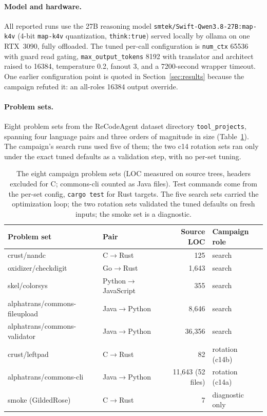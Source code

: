 \documentclass[11pt]{article}
\begin{document}
\paragraph{Model and hardware.}
All reported runs use the 27B reasoning model
\texttt{smtek/Swift-Qwen3.8-\allowbreak27B:map-k4v} (4-bit
\texttt{map-k4v}
quantization, \texttt{think:true}) served locally by ollama on one
RTX~3090, fully offloaded. The tuned per-call configuration is
\texttt{num\_ctx} 65536 with guard read gating,
\texttt{max\_out\allowbreak{}put\_to\allowbreak{}kens} 8192 with
translator and architect raised
to 16384, temperature 0.2, fanout 3, and a 7200-second wrapper
timeout.
One earlier configuration point is quoted in
Section~\ref{sec:results} because the campaign refuted it: an all-roles
16384 output override.

\paragraph{Problem sets.}
Eight problem sets from the ReCodeAgent dataset directory
\texttt{tool\_projects}, spanning four language
pairs and three orders of magnitude in size
(Table~\ref{tab:problems}). The campaign's search runs used five of
them; the two c14 rotation sets ran only under the exact tuned defaults
as a validation step, with no per-set tuning.

\begin{table}[ht]
\centering
\begin{tabular}{llrl}
\toprule
Problem set & Pair & Source LOC & Campaign role \\
\midrule
crust/nandc & C$\to$Rust & 125 & search \\
oxidizer/checkdigit & Go$\to$Rust & 1{,}643 & search \\
skel/colorsys & Python$\to$JavaScript & 355 & search \\
alphatrans/commons-fileupload & Java$\to$Python & 8{,}646 & search \\
alphatrans/commons-validator & Java$\to$Python & 36{,}356 & search \\
crust/leftpad & C$\to$Rust & 82 & rotation (c14b) \\
alphatrans/commons-cli & Java$\to$Python & 11{,}643 (52 files) & rotation (c14a) \\
smoke (GildedRose) & C$\to$Rust & 7 & diagnostic only \\
\bottomrule
\end{tabular}
\caption{The eight campaign problem sets (LOC measured on source trees,
headers excluded for C; commons-cli counted as Java files). Test commands
come from the per-set config, \texttt{cargo test} for Rust targets. The
five search sets carried the optimization loop; the two rotation sets
validated the tuned defaults on fresh inputs; the smoke set is a
diagnostic.}
\label{tab:problems}
\end{table}
\end{document}
